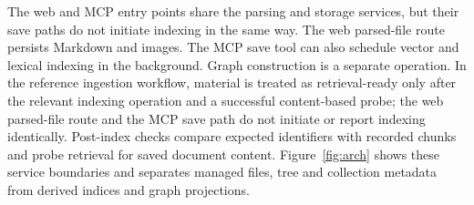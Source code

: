 The web and MCP entry points share the parsing and storage services, but
their save paths do not initiate indexing in the same way. The web parsed-file
route persists Markdown and images. The MCP save tool can also schedule vector
and lexical indexing in the background. Graph construction is a separate
operation. In the reference ingestion workflow, material is treated as
retrieval-ready only after the relevant indexing operation and a successful
content-based probe; the web parsed-file route and the MCP save path do not
initiate or report indexing identically. Post-index checks compare expected
identifiers with recorded chunks and probe retrieval for saved document
content. Figure~\ref{fig:arch} shows these service boundaries and separates
managed files, tree and collection metadata from derived indices and graph
projections.
